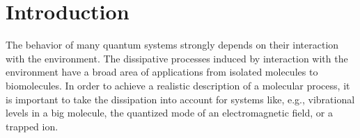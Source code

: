 \documentclass[12pt,twoside,a4paper]{report}
\begin{document}
\begin{tabbing}
\thispagestyle{plain}
\end{tabbing}
\newpage
\setcounter{tocdepth}{3}
\setcounter{secnumdepth}{3}


\chapter{Introduction}
%
%
%
The behavior of many quantum systems strongly depends on their interaction 
with the environment. 
The dissipative processes induced by interaction with the environment 
have a broad area of 
applications from isolated molecules to biomolecules.
In order to achieve a realistic description of a molecular process,
it is important to take the 
dissipation into account 
for
systems like, e.g., 
vibrational levels in a big molecule, the quantized mode of an 
electromagnetic field, or a trapped ion.  
 
\end{document}
